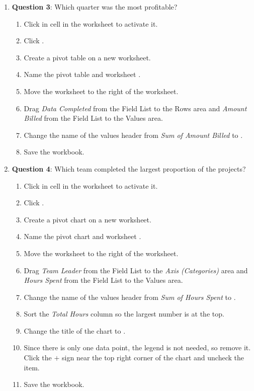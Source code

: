 \begin{enumerate}
	\item{\textbf{Question 3}: Which quarter was the most profitable?}

	\begin{enumerate}
		\item Click in cell  in the  worksheet to activate it.
		\item Click .
		\item Create a pivot table on a new worksheet.
		\item Name the pivot table and worksheet .
		\item Move the  worksheet to the right of the  worksheet.
		\item Drag \textit{Data Completed} from the Field List to the Rows area and \textit{Amount Billed} from the Field List to the Values area.
		\item Change the name of the values header from \textit{Sum of Amount Billed} to .
		\item Save the workbook.
	\end{enumerate}
	
	\item{\textbf{Question 4}: Which team completed the largest proportion of the projects?}

	\begin{enumerate}
		\item Click in cell  in the  worksheet to activate it.
		\item Click .
		\item Create a pivot chart on a new worksheet.
		\item Name the pivot chart and worksheet .
		\item Move the  worksheet to the right of the  worksheet.
		\item Drag \textit{Team Leader} from the Field List to the \textit{Axis (Categories)} area and \textit{Hours Spent} from the Field List to the Values area.
		\item Change the name of the values header from \textit{Sum of Hours Spent} to .
		\item Sort the \textit{Total Hours} column so the largest number is at the top.
		\item Change the title of the chart to .
		\item Since there is only one data point, the legend is not needed, so remove it. Click the $ + $ sign near the top right corner of the chart and uncheck the  item.
		\item Save the workbook.
	\end{enumerate}


\end{enumerate}
